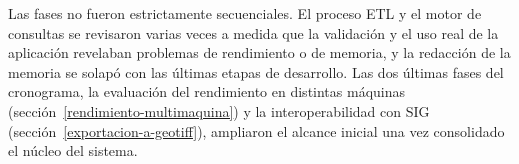 Las fases no fueron estrictamente secuenciales. El proceso ETL y el motor de consultas se revisaron varias veces a medida que la validación y el uso real de la aplicación revelaban problemas de rendimiento o de memoria, y la redacción de la memoria se solapó con las últimas etapas de desarrollo. Las dos últimas fases del cronograma, la evaluación del rendimiento en distintas máquinas (sección~\ref{rendimiento-multimaquina}) y la interoperabilidad con SIG (sección~\ref{exportacion-a-geotiff}), ampliaron el alcance inicial una vez consolidado el núcleo del sistema.
